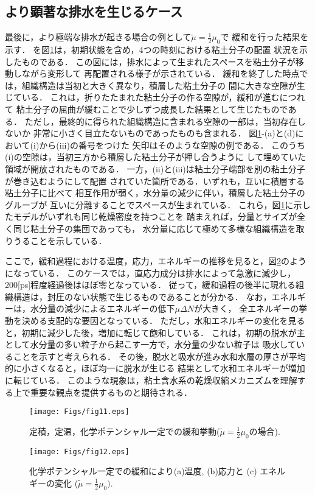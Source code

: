\subsection{より顕著な排水を生じるケース}
最後に，より極端な排水が起きる場合の例として$\tilde \mu =\frac{1}{2}\mu_0$で
緩和を行った結果を示す．
を図\ref{fig:fig11}は，初期状態を含め，4つの時刻における粘土分子の配置
状況を示したものである．
この図には，排水によって生まれたスペースを粘土分子が移動しながら変形して
再配置される様子が示されている．
緩和を終了した時点では，組織構造は当初と大きく異なり，積層した粘土分子の
間に大きな空隙が生じている．
これは，折りたたまれた粘土分子の作る空隙が，緩和が進むにつれて
粘土分子の屈曲が緩むことで少しずつ成長した結果として生じたものである．
ただし，最終的に得られた組織構造に含まれる空隙の一部は，当初存在しないか
非常に小さく目立たないものであったものも含まれる．
図\ref{fig:fig11}-(a)と(d)において(i)から(iii)の番号をつけた
矢印はそのような空隙の例である．
このうち(i)の空隙は，当初三方から積層した粘土分子が押し合うように
して埋めていた領域が開放されたものである．
一方，(ii)と(iii)は粘土分子端部を別の粘土分子が巻き込むようにして配置
されていた箇所である．いずれも，互いに積層する粘土分子に比べて
相互作用が弱く，水分量の減少に伴い，積層した粘土分子のグループが
互いに分離することでスペースが生まれている．
これら，図\ref{fig:fig11}に示したモデルがいずれも同じ乾燥密度を持つことを
踏まえれば，分量とサイズが全く同じ粘土分子の集団であっても，
水分量に応じて極めて多様な組織構造を取りうることを示している．

ここで，緩和過程における温度，応力，エネルギーの推移を見ると，図\ref{fig:fig12}のようになっている．
このケースでは，直応力成分は排水によって急激に減少し，200[ps]程度経過後はほぼ零となっている．
従って，緩和過程の後半に現れる組織構造は，封圧のない状態で生じるものであることが分かる．
なお，エネルギーは，水分量の減少によるエネルギーの低下$\mu \Delta N$が大きく，
全エネルギーの挙動を決める支配的な要因となっている．
ただし，水和エネルギーの変化を見ると，初期に減少した後，増加に転じて飽和している．
これは，初期の脱水が主として水分量の多い粒子から起こす一方で，水分量の少ない粒子は
吸水していることを示すと考えられる．
その後，脱水と吸水が進み水和水層の厚さが平均的に小さくなると，ほぼ均一に脱水が生じる
結果として水和エネルギーが増加に転じている．
このような現象は，粘土含水系の乾燥収縮メカニズムを理解する上で重要な観点を提供するものと期待される．
\begin{figure}[h]
	\begin{center}
	\texttt{[image: Figs/fig11.eps]} 
	\end{center}
	\caption{
		定積，定温，化学ポテンシャル一定での緩和挙動($\tilde \mu =\frac{1}{2}\mu_0$の場合).
	} 
	\label{fig:fig11}
\end{figure}
\begin{figure}[h]
	\begin{center}
	\texttt{[image: Figs/fig12.eps]} 
	\end{center}
	\caption{
		化学ポテンシャル一定での緩和により(a)温度, (b)応力と (c) エネルギーの変化
		($\tilde \mu =\frac{1}{2}\mu_0).$
	} 
	\label{fig:fig12}
\end{figure}


